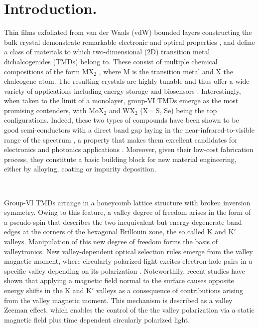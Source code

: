 \documentclass[aps,prb,showpacs,preprintnumbers,twocolumn,amsmath,amssymb]{revtex4-1}
\begin{document}
\section{Introduction.} 
Thin films exfoliated from van der Waals (vdW) bounded layers constructing the bulk crystal \cite{Novoselov2005a,Xu2013} demonstrate remarkable electronic and optical properties \cite{Butler2013,Splendiani2010,Mak2016,Schmidt2015}, and define a class of materials to which two-dimensional (2D) transition metal dichalcogenides (TMDs) belong to. These consist of multiple chemical compositions of the form MX$_2$ \cite{Structures1973}, where M is the transition metal and X the chalcogene atom. The resulting crystals are highly tunable and thus offer a wide variety of applications\cite{Choi2017} including energy storage\cite{Wu2014} and biosensors \cite{Wang2015}. Interestingly, when taken to the limit of a monolayer, group-VI
TMDs emerge as the most promising contenders, with MoX$_2$ and WX$_2$ (X= S, Se) being the top configurations. Indeed, these two types of compounds have been shown to be good semi-conductors with a direct
band gap laying in the near-infrared-to-visible range of the spectrum \cite{Splendiani2010,Mak2010,Zeng2013} , a property that makes them excellent
candidates for electronics and photonics applications \cite{Wang2014,Islam2014,Mak2010,Mak2016}. Moreover, given their low-cost fabrication process\cite{Wang2012,Chhowalla2013,Liu2012}, they constitute a basic building block for new material engineering, either by
alloying, coating or impurity deposition\cite{Zhang2016,Wang2014,Zhong2017}.

\


Group-VI TMDs arrange in a honeycomb lattice structure with broken inversion symmetry. Owing to this feature, a valley degree of freedom arises in the form of a pseudo-spin \cite{Xu2014,Wu2013,Yao2008,Song2015,Mak2014} that describes the two inequivalent but energy-degenerate band edges at the corners of the hexagonal Brillouin zone, the so called K and K$'$ valleys\cite{Xiao2012,Yao2008}. Manipulation of this new degree of freedom forms the basis of valleytronics\cite{Cao2011}. New valley-dependent optical selection rules \cite{Wang2017} emerge from the valley magnetic moment, where circularly polarized light excites electron-hole pairs in a specific valley depending on its polarization \cite{Suzuki2014,Song2015,Xiao2012,Sugawara2015}. Noteworthily, recent studies \cite{Srivastava2015,Wu2013,Li2014} have shown that applying a magnetic field normal to the surface causes opposite energy shifts in the K and K$'$ valleys as a consequence of contributions arising from the valley magnetic moment. This mechanism is described as a valley Zeeman effect, which enables the control of the the valley polarization via a  static magnetic field plus time dependent circularly polarized light. 
\end{document}

